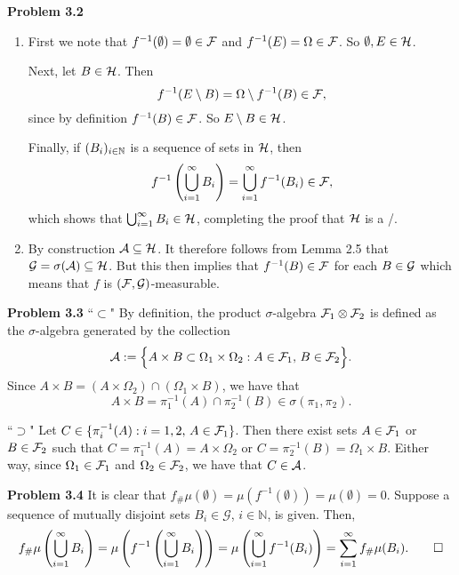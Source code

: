 
\textbf{Problem 3.2}

\begin{enumerate}[label=(\alph*)]
\item First we note that $f^{-1}(\emptyset) = \emptyset \in \mathcal F$ and $f^{-1}(E) = \Omega \in \mathcal F$. So $\emptyset, E \in \mathcal H$. 

Next, let $B \in \mathcal H$. Then
\[
	f^{-1}(E\setminus B) = \Omega \setminus f^{-1}(B) \in \mathcal F,
\]
since by definition $f^{-1}(B) \in \mathcal F$. So $E\setminus B \in \mathcal H$.

Finally, if $(B_i)_{i \in \mathbb N}$ is a sequence of sets in $\mathcal H$, then
\[
	f^{-1}\left(\bigcup_{i = 1}^\infty B_i\right) = \bigcup_{i = 1}^\infty f^{-1}(B_i) \in \mathcal F,
\]
which shows that $\bigcup_{i = 1}^\infty B_i \in \mathcal H$, completing the proof that $\mathcal H$ is a \sigalg/.
\item By construction $\mathcal A \subseteq \mathcal H$. It therefore follows from Lemma 2.5 that $\mathcal G = \sigma(\mathcal A) \subseteq \mathcal H$. But this then implies that $f^{-1}(B) \in \mathcal F$ for each $B \in \mathcal G$ which means that $f$ is $(\mathcal F, \mathcal G)$-measurable.
\end{enumerate}

\bigskip

\textbf{Problem 3.3}
``$\subset$" By definition, the product $\sigma$-algebra $\mathcal F_1\otimes\mathcal F_2$ is defined as the $\sigma$-algebra generated by the collection
\[
	\mathcal A := \Bigl\{ A\times B\subset \Omega_1\times\Omega_2 : A\in\mathcal F_1,\, B\in\mathcal F_2\Bigr\}.
\]
Since $A\times B = (A\times\Omega_2) \cap (\Omega_1\times B)$, we have that
\[
	A\times B = \pi_1^{-1}(A)\cap\pi_2^{-1}(B) \in \sigma(\pi_1,\pi_2).
\]

``$\supset$" Let $C\in \{ \pi_i^{-1}(A) : i=1,2,\, A\in\mathcal F_1\}$. Then there exist sets $A\in \mathcal F_1$ or $B\in \mathcal F_2$ such that $C = \pi_1^{-1}(A) = A\times\Omega_2$ or $C= \pi_2^{-1}(B) = \Omega_1\times B$. Either way, since $\Omega_1\in\mathcal F_1$ and $\Omega_2\in\mathcal F_2$, we have that $C\in\mathcal A$.

\bigskip


\textbf{Problem 3.4}
It is clear that $f_{\#}\mu(\emptyset) = \mu(f^{-1}(\emptyset)) = \mu(\emptyset) = 0$. 
	Suppose a sequence of mutually disjoint sets $B_i \in \mathcal{G}$, $i \in \mathbb{N}$, is given. Then,
	\[
	f_{\#} \mu\left( \bigcup_{i=1}^\infty B_i \right) = \mu\left( f^{-1} \left(\bigcup_{i=1}^\infty B_i \right) \right) = \mu \left( \bigcup_{i=1}^\infty  f^{-1}(B_i) \right) = \sum_{i=1}^\infty f_{\#}\mu (B_i). \qedhere
	\]
	
\bigskip

